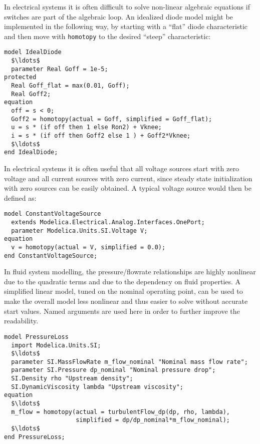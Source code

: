 \begin{example}[1]
In electrical systems it is often difficult to solve non-linear algebraic equations if switches are part of the algebraic loop.
An idealized diode model might be implemented in the following way, by starting with a ``flat'' diode characteristic and then move with \lstinline!homotopy! to the desired ``steep'' characteristic:
\begin{lstlisting}[language=modelica]
model IdealDiode
  $\ldots$
  parameter Real Goff = 1e-5;
protected
  Real Goff_flat = max(0.01, Goff);
  Real Goff2;
equation
  off = s < 0;
  Goff2 = homotopy(actual = Goff, simplified = Goff_flat);
  u = s * (if off then 1 else Ron2) + Vknee;
  i = s * (if off then Goff2 else 1 ) + Goff2*Vknee;
  $\ldots$
end IdealDiode;
\end{lstlisting}
\end{example}

\begin{example}[2]
In electrical systems it is often useful that all voltage sources start with zero voltage and all current sources with zero current, since steady state initialization with zero sources can be easily obtained.
A typical voltage source would then be defined as:
\begin{lstlisting}[language=modelica]
model ConstantVoltageSource
  extends Modelica.Electrical.Analog.Interfaces.OnePort;
  parameter Modelica.Units.SI.Voltage V;
equation
  v = homotopy(actual = V, simplified = 0.0);
end ConstantVoltageSource;
\end{lstlisting}
\end{example}

\begin{example}[3]
In fluid system modelling, the pressure/flowrate relationships are highly nonlinear due to the quadratic terms and due to the dependency on fluid properties.
A simplified linear model, tuned on the nominal operating point, can be used to make the overall model less nonlinear and thus easier to solve without accurate start values.
Named arguments are used here in order to further improve the readability.
\begin{lstlisting}[language=modelica]
model PressureLoss
  import Modelica.Units.SI;
  $\ldots$
  parameter SI.MassFlowRate m_flow_nominal "Nominal mass flow rate";
  parameter SI.Pressure dp_nominal "Nominal pressure drop";
  SI.Density rho "Upstream density";
  SI.DynamicViscosity lambda "Upstream viscosity";
equation
  $\ldots$
  m_flow = homotopy(actual = turbulentFlow_dp(dp, rho, lambda),
                    simplified = dp/dp_nominal*m_flow_nominal);
  $\ldots$
end PressureLoss;
\end{lstlisting}
\end{example}


